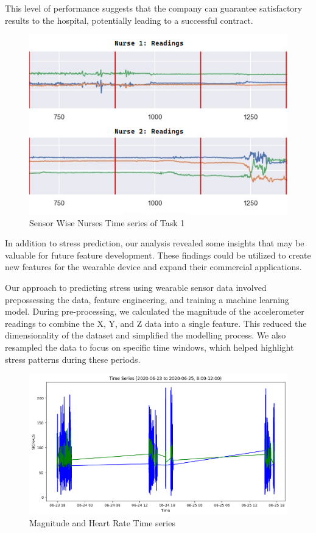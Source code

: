 \documentclass{article}
\begin{document}
This level of performance suggests that the company can guarantee satisfactory results to the hospital, potentially leading to a successful contract.
\begin{figure}
    \centering
    \includegraphics{NursesReadings.png}
    \caption{Sensor Wise Nurses Time series of Task 1}
    \label{fig:my_label}
\end{figure}

In addition to stress prediction, our analysis revealed some insights that may be valuable for future feature development. These findings could be utilized to create new features for the wearable device and expand their commercial applications.

Our approach to predicting stress using wearable sensor data involved prepossessing the data, feature engineering, and training a machine learning model. During pre-processing, we calculated the magnitude of the accelerometer readings to combine the X, Y, and Z data into a single feature. This reduced the dimensionality of the dataset and simplified the modelling process. We also resampled the data to focus on specific time windows, which helped highlight stress patterns during these periods.


\begin{figure}
    \centering
    \includegraphics[width=1\textwidth]{magnitude_HR.png}
    \caption{Magnitude and Heart Rate Time series}
    \label{fig:my_label}
\end{figure}
\end{document}
